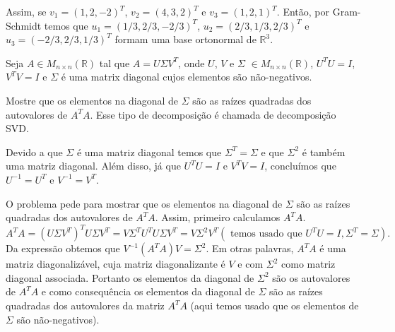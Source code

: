 \documentclass[11pt]{exam}
\begin{document}
\begin{questions}
\begin{solution}
     Assim, se $v_1=(1,2,-2)^{T}$, $v_2=(4,3,2)^{T}$ e $v_3=(1,2,1)^{T}$. Então, por Gram-Schmidt temos que 
     $u_1=(1/3,2/3,-2/3)^{T}$, $u_2=(2/3,1/3,2/3)^{T}$ e $u_3=(-2/3,2/3,1/3)^{T}$ formam uma base ortonormal
     de $\mathbb{R}^{3}$.
    \end{solution}

  \question[10]
  Seja $A \in M_{n\times n}(\mathbb{R})$ tal que $A=U \Sigma V^{T}$, onde 
  $U$, $V$ e $\Sigma$ $\in M_{n\times n}(\mathbb{R})$, $U^{T}U=I$, $V^{T}V=I$ e 
  $\Sigma$ é uma matrix diagonal cujos elementos são não-negativos. 
  
  Mostre que os elementos na diagonal de $\Sigma$ são as
  raízes quadradas dos autovalores de $A^{T}A$. Esse tipo de decomposição é chamada de 
  decomposição SVD.
    \begin{solution}
     Devido a que $\Sigma$ é uma matriz diagonal temos que $\Sigma^{T}=\Sigma$ e que 
     $\Sigma^{2}$ é também uma matriz diagonal. Além disso, já que 
     $U^{T}U=I$ e $V^{T}V=I$, concluímos que $U^{-1}=U^{T}$ e $V^{-1}=V^{T}$.
     
     O problema pede para mostrar que os elementos na diagonal de $\Sigma$ são as
  raízes quadradas dos autovalores de $A^{T}A$. Assim, primeiro calculamos $A^{T}A$.
    $$A^{T}A=(U \Sigma V^{T})^{T}U \Sigma V^{T}=V\Sigma^{T}U^{T}U\Sigma V^{T}=V \Sigma^{2} V^{T} 
    (\text{ temos usado que } U^{T}U=I, \Sigma^{T}=\Sigma).$$
    Da expressão obtemos que $V^{-1}(A^{T}A)V=\Sigma^{2}$. Em otras palavras, $A^{T}A$ é uma matriz diagonalizável, 
    cuja matriz diagonalizante é $V$ e com $\Sigma^{2}$ como matriz diagonal associada.
    Portanto os elementos da diagonal de $\Sigma^{2}$ são os autovalores de $A^{T}A$
    e como consequência os elementos da diagonal de $\Sigma$ são as raízes quadradas dos autovalores 
    da matriz $A^{T}A$ (aqui temos usado que os elementos de $\Sigma$ são não-negativos).
    \end{solution}

\end{questions}
\end{document}
